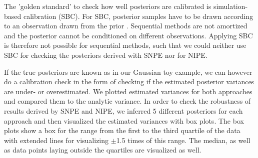 \documentclass[12pt]{extreport}
\begin{document}
The 'golden standard' to check how well posteriors are calibrated is simulation-based calibration (SBC). 
For SBC, posterior samples have to be drawn according to an observation drawn from the prior \citep{talts2018validating}. Sequential methods are not amortized and the posterior cannot be conditioned on different observations. Applying SBC is therefore not possible for sequential methods, such that we could neither use SBC for checking the posteriors derived with SNPE nor for NIPE. 

If the true posteriors are known as in our Gaussian toy example, we can however do a calibration check in the form of checking if the estimated posterior variances are under- or overestimated. We plotted estimated variances for both approaches and compared them to the analytic variance. In order to check the robustness of results derived by SNPE and NIPE, we inferred 5 different posteriors for each approach and then visualized the estimated variances with box plots. The box plots show a box for the range from the first to the third quartile of the data with extended lines for visualizing $\pm$1.5 times of this range. The median, as well as data points laying outside the quartiles are visualized as well.\\
\end{document}
